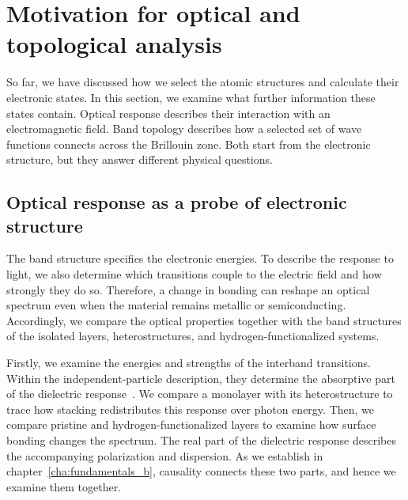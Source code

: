\FloatBarrier
\section{Motivation for optical and topological analysis}
\label{sec:intro_observables}

So far, we have discussed how we select the atomic structures and calculate their electronic states.
In this section, we examine what further information these states contain.
Optical response describes their interaction with an electromagnetic field.
Band topology describes how a selected set of wave functions connects across the Brillouin zone.
Both start from the electronic structure, but they answer different physical questions.

\FloatBarrier
\subsection{Optical response as a probe of electronic structure}
\label{subsec:opt_observables_motivation}

The band structure specifies the electronic energies.
To describe the response to light, we also determine which transitions couple to the electric field and how strongly they do so.
Therefore, a change in bonding can reshape an optical spectrum even when the material remains metallic or semiconducting.
Accordingly, we compare the optical properties together with the band structures of the isolated layers, heterostructures, and hydrogen-functionalized systems.

Firstly, we examine the energies and strengths of the interband transitions.
Within the independent-particle description, they determine the absorptive part of the dielectric response~\cite{onida2002electronic}.
We compare a monolayer with its heterostructure to trace how stacking redistributes this response over photon energy.
Then, we compare pristine and hydrogen-functionalized layers to examine how surface bonding changes the spectrum.
The real part of the dielectric response describes the accompanying polarization and dispersion.
As we establish in chapter~\ref{cha:fundamentals_b}, causality connects these two parts, and hence we examine them together.

